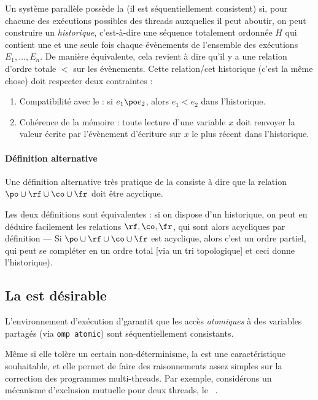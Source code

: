 Un système parallèle possède la  (il est \og
séquentiellement consistent\fg) si, pour chacune des exécutions possibles des
threads auxquelles il peut aboutir, on peut construire un \emph{historique},
c'est-à-dire une séquence totalement ordonnée $H$ qui contient une et une seule
fois chaque évènements de l'ensemble des exécutions $E_1, \dots, E_n$. De
manière équivalente, cela revient à dire qu'il y a une relation d'ordre totale
$<$ sur les évènements. Cette relation/cet historique (c'est la même chose) doit
respecter deux contraintes :
\begin{enumerate}
\item Compatibilité avec le  : si $e_1 \po e_2$, alors
  $e_1 < e_2$ dans l'historique.

\item Cohérence de la mémoire : toute lecture d'une variable $x$
  doit renvoyer la valeur écrite par l'évènement d'écriture sur $x$ le plus
  récent dans l'historique.
\end{enumerate}

\medskip

\paragraph{Définition alternative} Une définition alternative très pratique de
la  consiste à dire que la relation
$\po \cup \rf \cup \co \cup \fr$ doit être acyclique.

Les deux définitions sont équivalentes : si on dispose d'un historique, on peut
en déduire facilement les relations $\rf, \co, \fr$, qui sont alors acycliques
par définition --- Si $\po \cup \rf \cup \co \cup \fr$ est acyclique, alors
c'est un ordre partiel, qui peut se compléter en un ordre total [via un tri
topologique] et ceci donne l'historique).

\subsection{La  est désirable}
\label{sec:peterson-proof}

L'environnement d'exécution d'\OMP garantit que les accès \emph{atomiques} à des
variables partagés (via \texttt{omp atomic}) sont séquentiellement consistants.

Même si elle tolère un certain non-déterminisme, la  est une caractéristique souhaitable, et elle permet de faire des
raisonnements assez simples sur la correction des programmes multi-threads.  Par
exemple, considérons un mécanisme d'exclusion mutuelle pour deux threads, le
~\cite{Peterson81}.

